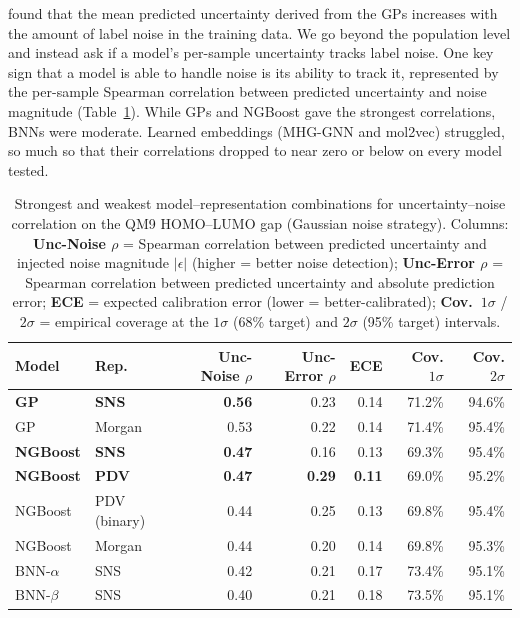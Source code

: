 \citet{Kolmar2021} found that the mean predicted uncertainty derived from the GPs increases with the amount of label noise in the training data. We go beyond the population level and instead ask if a model's per-sample uncertainty tracks label noise. One key sign that a model is able to handle noise is its ability to track it, represented by the per-sample Spearman correlation between predicted uncertainty and noise magnitude (Table~\ref{tab:top_unc_noise}). While GPs and NGBoost gave the strongest correlations, BNNs were moderate. Learned embeddings (MHG-GNN and mol2vec) struggled, so much so that their correlations dropped to near zero or below on every model tested. 

\begin{table}[htbp]
\centering
\caption{Strongest and weakest model--representation combinations for uncertainty--noise correlation on the QM9 HOMO--LUMO gap (Gaussian noise strategy). Columns: \textbf{Unc-Noise $\rho$} = Spearman correlation between predicted uncertainty and injected noise magnitude $|\epsilon|$ (higher = better noise detection); \textbf{Unc-Error $\rho$} = Spearman correlation between predicted uncertainty and absolute prediction error; \textbf{ECE} = expected calibration error (lower = better-calibrated); \textbf{Cov.\ $1\sigma$} / \textbf{$2\sigma$} = empirical coverage at the $1\sigma$ (68\% target) and $2\sigma$ (95\% target) intervals.}
\label{tab:top_unc_noise}
\small
\begin{tabular}{llrrrrr}
\toprule
\textbf{Model} & \textbf{Rep.} & \textbf{Unc-Noise $\rho$} & \textbf{Unc-Error $\rho$} & \textbf{ECE} & \textbf{Cov. $1\sigma$} & \textbf{Cov. $2\sigma$} \\
\midrule
\textbf{GP}    & \textbf{SNS}    & \textbf{0.56} & 0.23 & 0.14 & 71.2\% & 94.6\% \\
GP             & Morgan          & 0.53 & 0.22 & 0.14 & 71.4\% & 95.4\% \\
\textbf{NGBoost} & \textbf{SNS}  & \textbf{0.47} & 0.16 & 0.13 & 69.3\% & 95.4\% \\
\textbf{NGBoost} & \textbf{PDV}  & \textbf{0.47} & \textbf{0.29} & \textbf{0.11} & 69.0\% & 95.2\% \\
NGBoost        & PDV (binary)    & 0.44 & 0.25 & 0.13 & 69.8\% & 95.4\% \\
NGBoost        & Morgan          & 0.44 & 0.20 & 0.14 & 69.8\% & 95.3\% \\
BNN-$\alpha$   & SNS             & 0.42 & 0.21 & 0.17 & 73.4\% & 95.1\% \\
BNN-$\beta$    & SNS             & 0.40 & 0.21 & 0.18 & 73.5\% & 95.1\% \\

\end{tabular}
\end{table}

